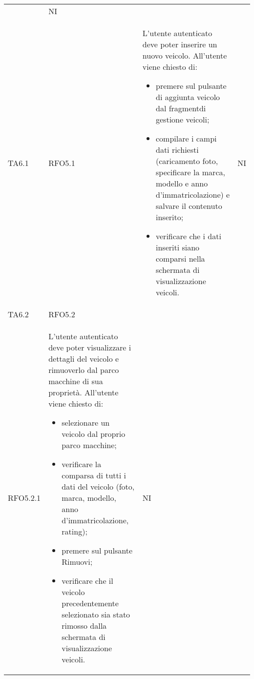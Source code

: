 \begin{longtable}{ >{\centering}p{} >{\centering}p{} >{\centering}p{}
			>{\centering}p{}}
\begin{itemize}
		 \end{itemize}	&	NI	\tabularnewline
		 TA6.1 & RFO5.1 &	L'utente autenticato deve poter inserire un nuovo veicolo. All'utente viene chiesto di:
		 \begin{itemize}
		 	\item premere sul pulsante di aggiunta veicolo dal fragment\glosp di gestione veicoli;
		 	\item compilare i campi dati richiesti (caricamento foto, specificare la marca, modello e anno d'immatricolazione) e salvare il contenuto inserito;
		 	\item verificare che i dati inseriti siano comparsi nella schermata di visualizzazione veicoli.
		 \end{itemize}	&	NI	\tabularnewline
		 TA6.2 & RFO5.2 \\ RFO5.2.1 &	L'utente autenticato deve poter visualizzare i dettagli del veicolo e rimuoverlo dal parco macchine di sua proprietà. All'utente viene chiesto di:
		 \begin{itemize}
		 	\item selezionare un veicolo dal proprio parco macchine;
		 	\item verificare la comparsa di tutti i dati del veicolo (foto, marca, modello, anno d'immatricolazione, rating);
		 	\item premere sul pulsante Rimuovi;
		 	\item verificare che il veicolo precedentemente selezionato sia stato rimosso dalla schermata di visualizzazione veicoli.
		 \end{itemize}	&	NI	\tabularnewline
		 

\end{longtable}
